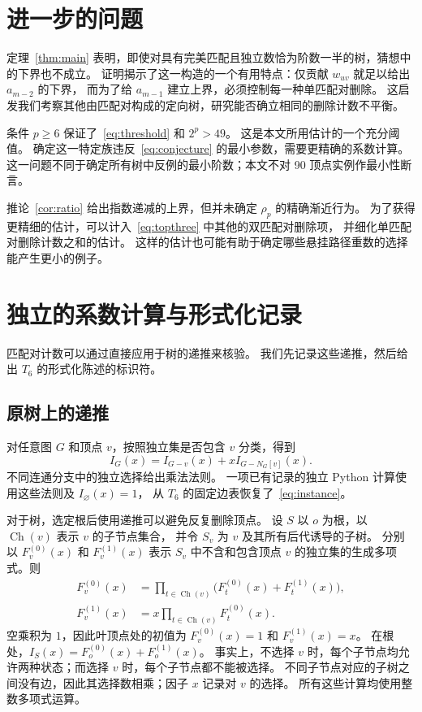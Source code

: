 \documentclass[UTF8,11pt,a4paper,fontset=fandol]{ctexart}
\theoremstyle{remark}
\numberwithin{equation}{section}
\begin{document}
\section{进一步的问题}\label{sec:discussion}

定理~\ref{thm:main} 表明，即使对具有完美匹配且独立数恰为阶数一半的树，猜想中的下界也不成立。
证明揭示了这一构造的一个有用特点：仅贡献 $w_{uv}$ 就足以给出 $a_{m-2}$ 的下界，
而为了给 $a_{m-1}$ 建立上界，必须控制每一种单匹配对删除。
这启发我们考察其他由匹配对构成的定向树，研究能否确立相同的删除计数不平衡。

条件 $p\geq6$ 保证了~\eqref{eq:threshold} 和 $2^p>49$。
这是本文所用估计的一个充分阈值。
确定这一特定族违反~\eqref{eq:conjecture} 的最小参数，需要更精确的系数计算。
这一问题不同于确定所有树中反例的最小阶数；本文不对 90 顶点实例作最小性断言。

推论~\ref{cor:ratio} 给出指数递减的上界，但并未确定 $\rho_p$ 的精确渐近行为。
为了获得更精细的估计，可以计入~\eqref{eq:topthree} 中其他的双匹配对删除项，
并细化单匹配对删除计数之和的估计。
这样的估计也可能有助于确定哪些悬挂路径重数的选择能产生更小的例子。

\appendix
\section{独立的系数计算与形式化记录}\label{app:verification}

匹配对计数可以通过直接应用于树的递推来核验。
我们先记录这些递推，然后给出 $T_6$ 的形式化陈述的标识符。

\subsection{原树上的递推}\label{app:rooted-recurrence}

对任意图 $G$ 和顶点 $v$，按照独立集是否包含 $v$ 分类，得到
\begin{equation}\label{eq:vertex-recurrence}
 I_G(x)=I_{G-v}(x)+xI_{G-N_G[v]}(x).
\end{equation}
不同连通分支中的独立选择给出乘法法则。
一项已有记录的独立 Python 计算使用这些法则及 $I_{\varnothing}(x)=1$，
从 $T_6$ 的固定边表恢复了~\eqref{eq:instance}。

对于树，选定根后使用递推可以避免反复删除顶点。
设 $S$ 以 $o$ 为根，以 $\operatorname{Ch}(v)$ 表示 $v$ 的子节点集合，
并令 $S_v$ 为 $v$ 及其所有后代诱导的子树。
分别以 $F_v^{(0)}(x)$ 和 $F_v^{(1)}(x)$ 表示 $S_v$ 中不含和包含顶点 $v$ 的独立集的生成多项式。则
\begin{equation}\label{eq:rooted-recurrence}
\begin{aligned}
 F_v^{(0)}(x)
 &=\prod_{t\in\operatorname{Ch}(v)}
       \bigl(F_t^{(0)}(x)+F_t^{(1)}(x)\bigr),\\
 F_v^{(1)}(x)
 &=x\prod_{t\in\operatorname{Ch}(v)}F_t^{(0)}(x).
\end{aligned}
\end{equation}
空乘积为 $1$，因此叶顶点处的初值为 $F_v^{(0)}(x)=1$ 和 $F_v^{(1)}(x)=x$。
在根处，$I_S(x)=F_o^{(0)}(x)+F_o^{(1)}(x)$。
事实上，不选择 $v$ 时，每个子节点均允许两种状态；而选择 $v$ 时，每个子节点都不能被选择。
不同子节点对应的子树之间没有边，因此其选择数相乘；因子 $x$ 记录对 $v$ 的选择。
所有这些计算均使用整数多项式运算。
\end{document}
